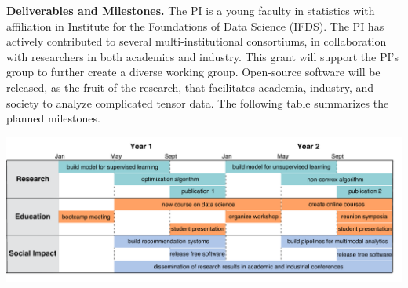 \documentclass[10pt]{article}
\theoremstyle{plain}
\theoremstyle{definition}
\begin{document}
{\bf Deliverables and Milestones.}
The PI is a young faculty in statistics with affiliation in Institute for the Foundations of Data Science (IFDS). The PI has actively contributed to several multi-institutional consortiums, in collaboration with researchers in both academics and industry. This grant will support the PI's group to further create a diverse working group. Open-source software will be released, as the fruit of the research, that facilitates academia, industry, and society to analyze complicated tensor data.  The following table summarizes the planned milestones. 
\vspace{-.3cm}
\begin{center}
\includegraphics[width=.9\textwidth]{milestone.pdf}
\end{center}
\vspace{-.4cm}
\end{document}
